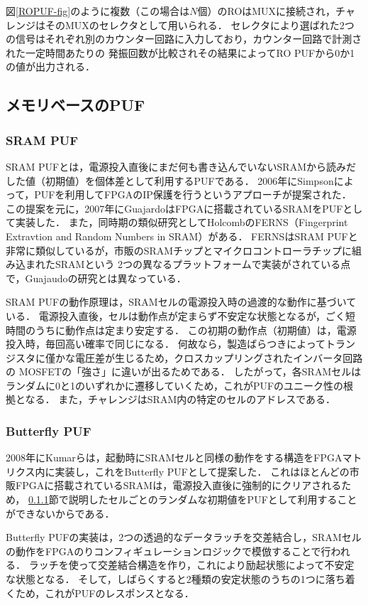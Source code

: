 \documentclass[technicalreport]{ieicej} %
\begin{document}
図\ref{ROPUF-fig}のように複数（この場合は$N$個）のROはMUXに接続され，チャレンジはそのMUXのセレクタとして用いられる．
セレクタにより選ばれた2つの信号はそれぞれ別のカウンター回路に入力しており，カウンター回路で計測された一定時間あたりの
発振回数が比較されその結果によってRO PUFから0か1の値が出力される．
\subsection{メモリベースのPUF}
\subsubsection{SRAM PUF}
\label{SRAM PUF}
SRAM PUFとは，電源投入直後にまだ何も書き込んでいないSRAMから読みだした値（初期値）を個体差として利用するPUFである\cite{sugatake}．
2006年にSimpsonによって，PUFを利用してFPGAのIP保護を行うというアプローチ\cite{simpson}が提案された．
この提案を元に，2007年にGuajardoはFPGAに搭載されているSRAMをPUFとして実装\cite{guajaudo}した．
また，同時期の類似研究としてHolcombのFERNS（Fingerprint Extravtion and Random Numbers in SRAM）\cite{holcomb}がある．
FERNSはSRAM PUFと非常に類似しているが，市販のSRAMチップとマイクロコントローラチップに組み込まれたSRAMという
2つの異なるプラットフォームで実装がされている点で，Guajaudoの研究とは異なっている\cite{maes1}．

SRAM PUFの動作原理は，SRAMセルの電源投入時の過渡的な動作に基づいている．
電源投入直後，セルは動作点が定まらず不安定な状態となるが，ごく短時間のうちに動作点は定まり安定する．
この初期の動作点（初期値）は，電源投入時，毎回高い確率で同じになる．
何故なら，製造ばらつきによってトランジスタに僅かな電圧差が生じるため，クロスカップリングされたインバータ回路の
MOSFETの「強さ」に違いが出るためである\cite{maes1}．
したがって，各SRAMセルはランダムに0と1のいずれかに遷移していくため，これがPUFのユニーク性の根拠となる．
また，チャレンジはSRAM内の特定のセルのアドレスである．
\subsubsection{Butterfly PUF}
2008年にKumarらは，起動時にSRAMセルと同様の動作をする構造をFPGAマトリクス内に実装し，これをButterfly PUF\cite{kumar}として提案した．
これはほとんどの市販FPGAに搭載されているSRAMは，電源投入直後に強制的にクリアされるため，
\ref{SRAM PUF}節で説明したセルごとのランダムな初期値をPUFとして利用することができないからである．

Butterfly PUFの実装は，2つの透過的なデータラッチを交差結合し，SRAMセルの動作をFPGAのりコンフィギュレーションロジックで模倣することで行われる．
ラッチを使って交差結合構造を作り，これにより励起状態によって不安定な状態となる．
そして，しばらくすると2種類の安定状態のうちの1つに落ち着くため，これがPUFのレスポンスとなる．
\end{document}
